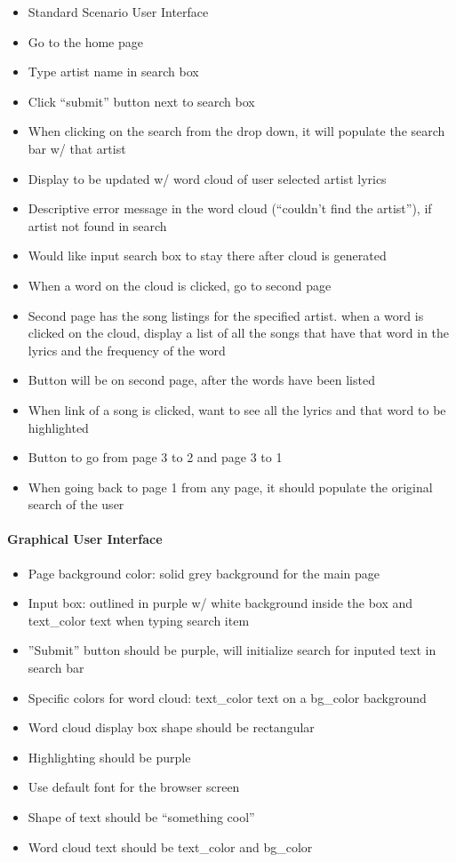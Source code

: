 \documentclass[]{article}
\begin{document}
\begin{itemize}
\itemsep1pt\parskip0pt
\item
  Standard Scenario User Interface
\item
  Go to the home page
\item
  Type artist name in search box
\item
  Click ``submit'' button next to search box
\item
  When clicking on the search from the drop down, it will populate the
  search bar w/ that artist
\item
  Display to be updated w/ word cloud of user selected artist lyrics
\item
  Descriptive error message in the word cloud (``couldn't find the
  artist''), if artist not found in search
\item
  Would like input search box to stay there after cloud is generated
\item
  When a word on the cloud is clicked, go to second page
\item
  Second page has the song listings for the specified artist. when a
  word is clicked on the cloud, display a list of all the songs that
  have that word in the lyrics and the frequency of the word
\item
  Button will be on second page, after the words have been listed
\item
  When link of a song is clicked, want to see all the lyrics and that
  word to be highlighted
\item
  Button to go from page 3 to 2 and page 3 to 1
\item
  When going back to page 1 from any page, it should populate the
  original search of the user
\end{itemize}

\paragraph{Graphical User Interface}\label{graphical-user-interface}

\begin{itemize}
\itemsep1pt\parskip0pt
\item
  Page background color: solid grey background for the main page
\item
  Input box: outlined in purple w/ white background inside the box and
  text\_color text when typing search item
\item
  ''Submit'' button should be purple, will initialize search for inputed
  text in search bar
\item
  Specific colors for word cloud: text\_color text on a bg\_color
  background
\item
  Word cloud display box shape should be rectangular
\item
  Highlighting should be purple
\item
  Use default font for the browser screen
\item
  Shape of text should be ``something cool''
\item
  Word cloud text should be text\_color and bg\_color
\end{itemize}
\end{document}
